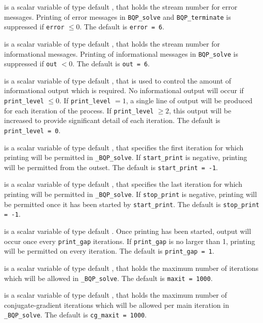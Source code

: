 \documentclass{galahad}
\newcommand{\packagename}{BQP}
\newcommand{\fullpackagename}{\libraryname\_\packagename}
\newcommand{\solver}{{\tt \fullpackagename\_solve}}
\begin{document}
\begin{description}

 is a scalar variable of type default \integer, that holds the
stream number for error messages. Printing of error messages in 
{\tt \packagename\_solve} and {\tt \packagename\_terminate} 
is suppressed if {\tt error} $\leq 0$.
The default is {\tt error = 6}.

 is a scalar variable of type default \integer, that holds the
stream number for informational messages. Printing of informational messages in 
{\tt \packagename\_solve} is suppressed if {\tt out} $< 0$.
The default is {\tt out = 6}.

 is a scalar variable of type default \integer, that is used
to control the amount of informational output which is required. No 
informational output will occur if {\tt print\_level} $\leq 0$. If 
{\tt print\_level} $= 1$, a single line of output will be produced for each
iteration of the process. If {\tt print\_level} $\geq 2$, this output will be
increased to provide significant detail of each iteration.
The default is {\tt print\_level = 0}.

 is a scalar variable of type default \integer, that specifies
the first iteration for which printing will be permitted in \solver.
If {\tt start\_print} is negative, printing will be permitted from the outset.
The default is {\tt start\_print = -1}.

 is a scalar variable of type default \integer, that specifies
the last iteration for which printing will be permitted in  \solver.
If {\tt stop\_print} is negative, printing will be permitted once it has been 
started by {\tt start\_print}.
The default is {\tt stop\_print = -1}.

 is a scalar variable of type default \integer.
Once printing has been started, output will occur once every
{\tt print\_gap} iterations. If {\tt print\_gap} is no larger than 1, 
printing will be permitted on every iteration.
The default is {\tt print\_gap = 1}.

 is a scalar variable of type default \integer, that holds the
maximum number of iterations which will be allowed in \solver.
The default is {\tt maxit = 1000}.

 is a scalar variable of type default \integer, that holds the
maximum number of conjugate-gradient iterations which will be allowed 
per main iteration in \solver.
The default is {\tt cg\_maxit = 1000}.


\end{description}
\end{document}
